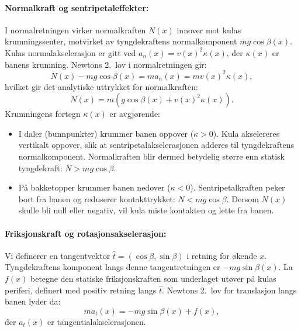 \documentclass[11pt,a4paper]{article}
\begin{document}
\paragraph{Normalkraft og sentripetaleffekter:}
I normalretningen virker normalkraften $N(x)$ innover mot kulas krumningssenter, motvirket av tyngdekraftens normalkomponent $mg\cos\beta(x)$. Kulas normalakselerasjon er gitt ved $a_n(x) = v(x)^2\kappa(x)$, der $\kappa(x)$ er banens krumning. Newtons 2.~lov i normalretningen gir:
\begin{equation}
    N(x) - mg\cos\beta(x) = m a_n(x) = m v(x)^2\kappa(x),
\end{equation}
hvilket gir det analytiske uttrykket for normalkraften:
\begin{equation}
    N(x) = m\left(g\cos\beta(x) + v(x)^2\kappa(x)\right).
    \label{eq:normalkraft}
\end{equation}
Krumningens fortegn $\kappa(x)$ er avgjørende:
\begin{itemize}
    \item I daler (bunnpunkter) krummer banen oppover ($\kappa > 0$). Kula akselereres vertikalt oppover, slik at sentripetalakselerasjonen adderes til tyngdekraftens normalkomponent. Normalkraften blir dermed betydelig større enn statisk tyngdekraft: $N > mg\cos\beta$.
    \item På bakketopper krummer banen nedover ($\kappa < 0$). Sentripetalkraften peker bort fra banen og reduserer kontakttrykket: $N < mg\cos\beta$. Dersom $N(x)$ skulle bli null eller negativ, vil kula miste kontakten og lette fra banen.
\end{itemize}

\paragraph{Friksjonskraft og rotasjonsakselerasjon:}
Vi definerer en tangentvektor $\hat{t} = (\cos\beta, \sin\beta)$ i retning for økende $x$. Tyngdekraftens komponent langs denne tangentretningen er $-mg\sin\beta(x)$. La $f(x)$ betegne den statiske friksjonskraften som underlaget utøver på kulas periferi, definert med positiv retning langs $\hat{t}$. Newtons 2.~lov for translasjon langs banen lyder da:
\begin{equation}
    m a_t(x) = -mg\sin\beta(x) + f(x),
    \label{eq:newton_tang}
\end{equation}
der $a_t(x)$ er tangentialakselerasjonen. 
\end{document}
